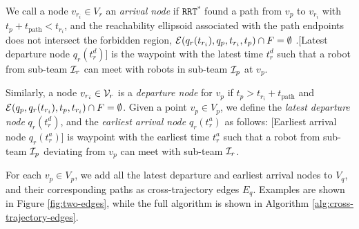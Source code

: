\documentclass[journal]{IEEEtran}  %
\newcommand{\rrtstar}{$\texttt{RRT}^\texttt{*}$}
\begin{document}

\begin{description}
\item We call a node $v_{{r}_{i}} \in V_{r}$ an \emph{arrival node} if \rrtstar{} found a path from $v_p$ to  $v_{{r}_{i}}$ with $t_{p}+t_{\textrm{path}}<t_{{r}_{i}}$, and the reachability ellipsoid associated with the path endpoints does not intersect the forbidden region, $\mathcal{E}(q_{r}(t_{{r}_{i}}),q_{p},t_{{r}_{i}},t_{p}) \cap F = \emptyset$ .[Latest departure node $q_{r}(t^{d}_r)$] is the waypoint with the latest time $t^{d}_r$ such that a robot from sub-team $\mathcal{I}_r$  can meet with robots in sub-team $\mathcal{I}_p$ at $v_{p}$.
\item
 Similarly, a node $v_{r_i}\in\mathcal{V}_r$ is a \emph{departure node} for $v_p$ if  $t_{p}>t_{{r}_{i}}+t_{\textrm{path}}$ and $\mathcal{E}(q_{p}, q_{r}(t_{{r}_{i}}),t_{p}, t_{{r}_{i}}) \cap F = \emptyset$. Given a point $v_{p} \in V_{p}$, we define the \emph{latest departure node} $q_{r}(t^{d}_r)$, and the \emph{earliest arrival node} $q_{r}(t^{a}_r)$ as follows:
[Earliest arrival node $q_{r}(t^{a}_r)$] is waypoint with the earliest time $t^{a}_r$ such that a robot from sub-team $\mathcal{I}_p$ deviating from $v_{p}$ can meet with sub-team $\mathcal{I}_r$.
\end{description}

For each $v_{p} \in V_{p}$, we add all the latest departure and earliest arrival nodes to $V_{q}$, and their corresponding paths as cross-trajectory edges $E_{q}$. Examples are shown in Figure \ref{fig:two-edges}, while the full algorithm is shown in Algorithm \ref{alg:cross-trajectory-edges}.
\end{document}
